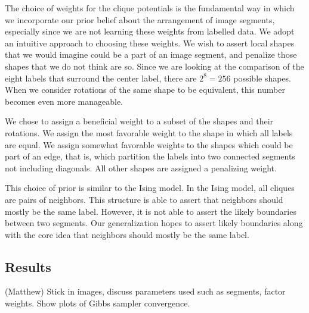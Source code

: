 \documentclass[12pt]{article}
\begin{document}
The choice of weights for the clique potentials is the fundamental way in which
we incorporate our prior belief about the arrangement of image segments,
especially since we are not learning these weights from labelled data. We adopt
an intuitive approach to choosing these weights. We wish to assert local shapes
that we would imagine could be a part of an image segment, and penalize those
shapes that we do not think are so. Since we are looking at the comparison of
the eight labels that surround the center label, there are $2^8 = 256$ possible
shapes. When we consider rotations of the same shape to be equivalent, this
number becomes even more manageable.

We chose to assign a beneficial weight to a subset of the shapes and their
rotations. We assign the most favorable weight to the shape in which all labels
are equal. We assign somewhat favorable weights to the shapes which could be
part of an edge, that is, which partition the labels into two connected
segments not including diagonals. All other shapes are assigned a penalizing
weight. 
%

This choice of prior is similar to the Ising model. In the Ising model, all
cliques are pairs of neighbors. This structure is able to assert that neighbors
should mostly be the same label. However, it is not able to assert the likely
boundaries between two segments. Our generalization hopes to assert likely
boundaries along with the core idea that neighbors should mostly be the same
label.


\subsection*{Results}(Matthew)
Stick in images, discuss parameters used such as segments, factor weights.
Show plots of Gibbs sampler convergence.
\end{document}
